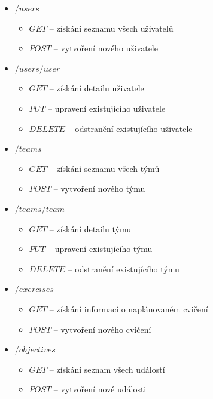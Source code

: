 \documentclass[
  digital, %
  twoside, %
  table,   %
  lof,     %
  lot,     %
]{fithesis3}
\begin{document}
\renewcommand\labelitemii{$\square$}
\begin{itemize}
    \item $/users$
    \begin{itemize}
        \item $GET$ -- získání seznamu všech uživatelů
        \item $POST$ --  vytvoření nového uživatele
    \end{itemize}
    
    \item $/users/{user}$
    \begin{itemize}
        \item $GET$ -- získání detailu uživatele
        \item $PUT$ -- upravení existujícího uživatele
        \item $DELETE$ -- odstranění existujícího uživatele
    \end{itemize}
    
    \item $/teams$
    \begin{itemize}
        \item $GET$ -- získání seznamu všech týmů
        \item $POST$ --  vytvoření nového týmu
    \end{itemize}
    
    \item $/teams/{team}$
    \begin{itemize}
        \item $GET$ -- získání detailu týmu
        \item $PUT$ -- upravení existujícího týmu
        \item $DELETE$ -- odstranění existujícího týmu
    \end{itemize}
    
    \item $/exercises$
    \begin{itemize}
        \item $GET$ -- získání informací o naplánovaném cvičení
        \item $POST$ -- vytvoření nového cvičení
    \end{itemize}
    
    \item $/objectives$
    \begin{itemize}
        \item $GET$ -- získání seznam všech událostí
        \item $POST$ --  vytvoření nové události
    \end{itemize}
        

\end{itemize}
\end{document}
